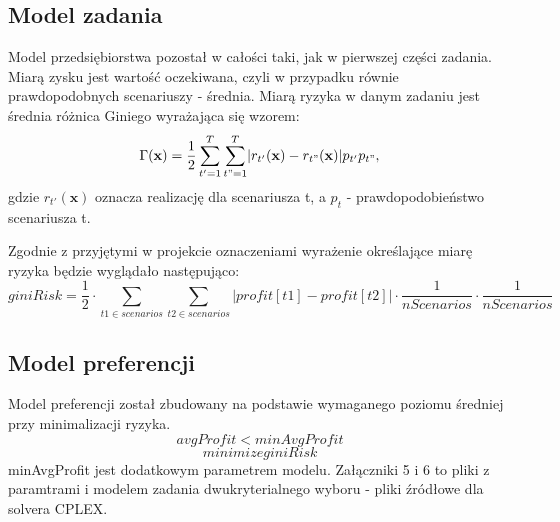 \documentclass[11pt,a4paper]{article}
\begin{document}
\subsection{Model zadania}
Model przedsiębiorstwa pozostał w całości taki, jak w pierwszej części zadania. Miarą zysku jest wartość oczekiwana, czyli w przypadku równie prawdopodobnych scenariuszy - średnia. Miarą ryzyka w danym zadaniu jest średnia różnica Giniego wyrażająca się wzorem:
\begin{equation}
\Gamma(\mathbf{x})=\frac{1}{2}\sum_{t'=1}^{T}\sum_{t"=1}^{T}\lvert r_{t'}(\mathbf{x})-r_{t"}(\mathbf{x})\rvert p_{t'}p_{t"}, 
\end{equation}
gdzie $r_{t'}(\mathbf{x})$ oznacza realizację dla scenariusza t, a $p_{t}$ - prawdopodobieństwo scenariusza t.

Zgodnie z przyjętymi w projekcie oznaczeniami wyrażenie określające miarę ryzyka będzie wyglądało następująco:
\begin{equation}
giniRisk = \frac{1}{2}\cdot\sum_{t1 \in scenarios}\sum_{t2 \in scenarios} \lvert profit[t1]-profit[t2] \rvert \cdot \frac{1}{nScenarios} \cdot \frac{1}{nScenarios} 
\end{equation}

\subsection{Model preferencji}
Model preferencji został zbudowany na podstawie wymaganego poziomu średniej przy minimalizacji ryzyka.
\begin{equation}
avgProfit<minAvgProfit
\end{equation}
\begin{equation}
minimize giniRisk
\end{equation}
minAvgProfit jest dodatkowym parametrem modelu. Załączniki 5 i 6 to pliki z paramtrami i modelem zadania dwukryterialnego wyboru - pliki źródłowe dla solvera CPLEX. 
\end{document}
